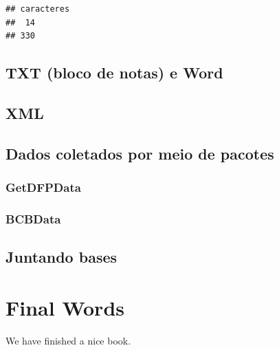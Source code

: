 \documentclass[
]{book}
\begin{document}
\begin{verbatim}
## caracteres
##  14 
## 330
\end{verbatim}

\hypertarget{txt-bloco-de-notas-e-word}{%
\section{TXT (bloco de notas) e Word}\label{txt-bloco-de-notas-e-word}}

\hypertarget{xml}{%
\section{XML}\label{xml}}

\hypertarget{dados-coletados-por-meio-de-pacotes}{%
\section{Dados coletados por meio de pacotes}\label{dados-coletados-por-meio-de-pacotes}}

\hypertarget{getdfpdata}{%
\subsection{GetDFPData}\label{getdfpdata}}

\hypertarget{bcbdata}{%
\subsection{BCBData}\label{bcbdata}}

\hypertarget{juntando-bases}{%
\section{Juntando bases}\label{juntando-bases}}

\hypertarget{final-words}{%
\chapter{Final Words}\label{final-words}}

We have finished a nice book.

  
\end{document}
